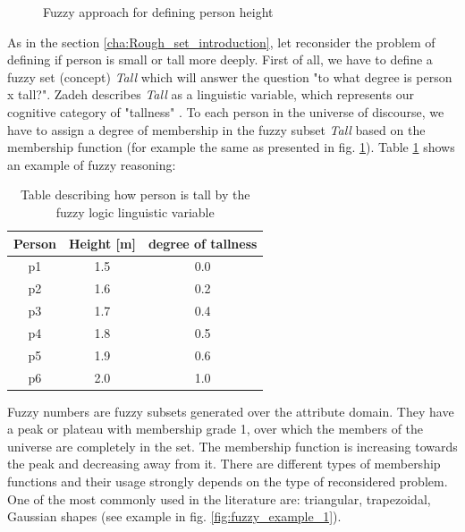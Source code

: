 \begin{itemize}
\begin{figure}[H]
\begin{center}
            \end{center}
            \caption{Fuzzy approach for defining person height}
            \label{fig:fuzzy_tall}
        \end{figure}
\end{itemize}

As in the section \ref{cha:Rough_set_introduction}, let reconsider the problem of defining 
if person is small or tall more deeply. First of all, we have to define a fuzzy
set (concept) \textit{Tall} which will answer the question 
"to what degree is person x tall?". Zadeh describes \textit{Tall} as a
linguistic variable, which represents our cognitive category of "tallness"
\cite{bib25}. To each person in the universe of discourse, 
we have to assign a degree of membership in the fuzzy subset \textit{Tall}
based on the membership function (for example the same as presented in fig.
\ref{fig:fuzzy_tall}). Table \ref{tab:fuzzy_logic_example} shows an example of fuzzy
reasoning:
\begin{table}[H]
    \centering
    \caption{Table describing how person is tall by the fuzzy logic linguistic
    variable}
    \begin{tabular}{|c|c|c|}
        \hline
        Person & Height [m] & degree of tallness \\ \hline \hline
        p1 & 1.5 & 0.0 \\ \hline
        p2 & 1.6 & 0.2 \\ \hline
        p3 & 1.7 & 0.4 \\ \hline
        p4 & 1.8 & 0.5 \\ \hline
        p5 & 1.9 & 0.6 \\ \hline
        p6 & 2.0 & 1.0 \\ \hline
    \end{tabular}
    \label{tab:fuzzy_logic_example}
\end{table}

Fuzzy numbers are fuzzy subsets generated over the attribute domain. 
They have a peak or plateau with membership grade 1, over which the 
members of the universe are completely in the set.  The membership 
function is increasing towards the peak and decreasing away from it. 
There are different types of membership functions and their usage 
strongly depends on the type of reconsidered problem. One of the most 
commonly used in the literature are: triangular, trapezoidal, Gaussian shapes
(see example in fig. \ref{fig:fuzzy_example_1}).

